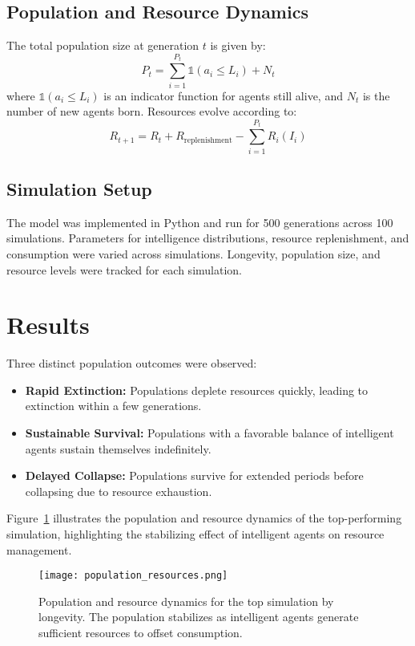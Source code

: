 \documentclass[12pt]{article}
\begin{document}
\subsection{Population and Resource Dynamics}
The total population size at generation \( t \) is given by:
\[
P_t = \sum_{i=1}^{P_t} \mathbb{1}(a_i \leq L_i) + N_t
\]
where \( \mathbb{1}(a_i \leq L_i) \) is an indicator function for agents still alive, and \( N_t \) is the number of new agents born. Resources evolve according to:
\[
R_{t+1} = R_t + R_\text{replenishment} - \sum_{i=1}^{P_t} R_i(I_i)
\]

\subsection{Simulation Setup}
The model was implemented in Python and run for 500 generations across 100 simulations. Parameters for intelligence distributions, resource replenishment, and consumption were varied across simulations. Longevity, population size, and resource levels were tracked for each simulation.

\section{Results}
Three distinct population outcomes were observed:
\begin{itemize}
    \item \textbf{Rapid Extinction:} Populations deplete resources quickly, leading to extinction within a few generations.
    \item \textbf{Sustainable Survival:} Populations with a favorable balance of intelligent agents sustain themselves indefinitely.
    \item \textbf{Delayed Collapse:} Populations survive for extended periods before collapsing due to resource exhaustion.
\end{itemize}

Figure~\ref{fig:population_resources} illustrates the population and resource dynamics of the top-performing simulation, highlighting the stabilizing effect of intelligent agents on resource management.

\begin{figure}[h!]
    \centering
    \texttt{[image: population\_resources.png]}
    \caption{Population and resource dynamics for the top simulation by longevity. The population stabilizes as intelligent agents generate sufficient resources to offset consumption.}
    \label{fig:population_resources}
\end{figure}
\end{document}

